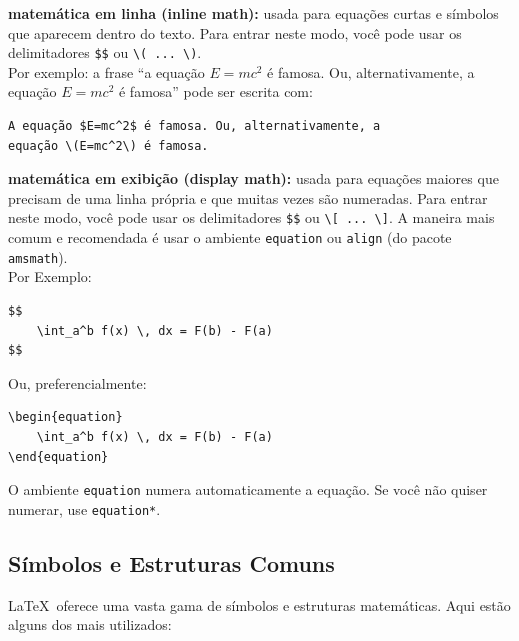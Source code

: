 \begin{alineas}
	\item \textbf{matemática em linha (inline math):} usada para equações curtas e símbolos que aparecem dentro do texto. Para entrar neste modo, você pode usar os delimitadores \verb|$$| ou \verb|\( ... \)|.\\
	Por exemplo: a frase ``a equação $E=mc^2$ é famosa. Ou, alternativamente, a equação \(E=mc^2\) é famosa'' pode ser escrita com:
	\begin{lstlisting}[language={[LaTeX]TeX}]
A equação $E=mc^2$ é famosa. Ou, alternativamente, a
equação \(E=mc^2\) é famosa. 
	\end{lstlisting}
	
	\item \textbf{matemática em exibição (display math):} usada para equações maiores que precisam de uma linha própria e que muitas vezes são numeradas. Para entrar neste modo, você pode usar os delimitadores \verb|$$| ou \verb|\[ ... \]|. A maneira mais comum e recomendada é usar o ambiente \texttt{equation} ou \texttt{align} (do pacote \texttt{amsmath}).\\
	Por Exemplo:
	\begin{lstlisting}[language={[LaTeX]TeX}]
$$
	\int_a^b f(x) \, dx = F(b) - F(a)
$$
	\end{lstlisting}
	Ou, preferencialmente:
	\begin{lstlisting}[language={[LaTeX]TeX}]
\begin{equation}
	\int_a^b f(x) \, dx = F(b) - F(a)
\end{equation}
	\end{lstlisting}
	O ambiente \texttt{equation} numera automaticamente a equação. Se você não quiser numerar, use \texttt{equation*}.
\end{alineas}



\subsection{Símbolos e Estruturas Comuns}

\LaTeX\ oferece uma vasta gama de símbolos e estruturas matemáticas. Aqui estão alguns dos mais utilizados:


